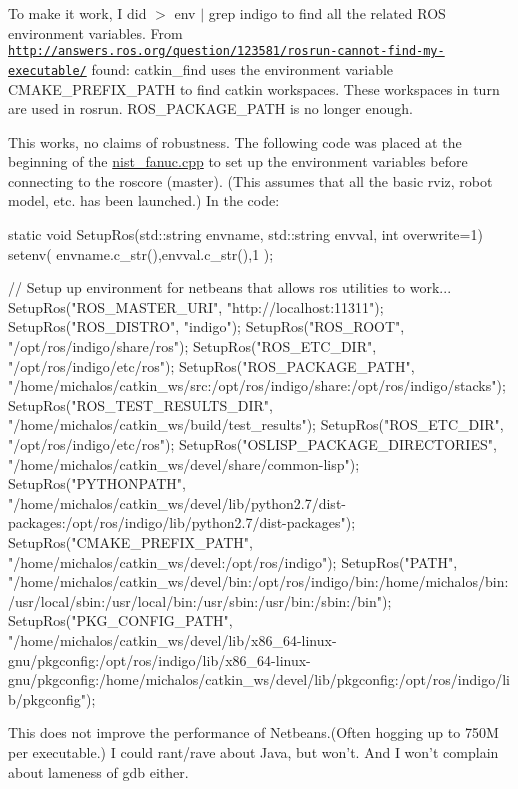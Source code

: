 To make it work, I did $>$ env $\vert$ grep indigo to find all the related R\-O\-S environment variables. From \href{http://answers.ros.org/question/123581/rosrun-cannot-find-my-executable/}{\tt http\-://answers.\-ros.\-org/question/123581/rosrun-\/cannot-\/find-\/my-\/executable/} found\-: catkin\-\_\-find uses the environment variable C\-M\-A\-K\-E\-\_\-\-P\-R\-E\-F\-I\-X\-\_\-\-P\-A\-T\-H to find catkin workspaces. These workspaces in turn are used in rosrun. R\-O\-S\-\_\-\-P\-A\-C\-K\-A\-G\-E\-\_\-\-P\-A\-T\-H is no longer enough.

This works, no claims of robustness. The following code was placed at the beginning of the \hyperlink{nist__fanuc_8cpp}{nist\-\_\-fanuc.\-cpp} to set up the environment variables before connecting to the roscore (master). (This assumes that all the basic rviz, robot model, etc. has been launched.) In the code\-: \begin{DoxyVerb}static void SetupRos(std::string  envname, std::string envval, int overwrite=1)
{
        setenv( envname.c_str(),envval.c_str(),1 );
}

       // Setup up environment for netbeans that allows ros utilities to work...
        SetupRos("ROS_MASTER_URI", "http://localhost:11311");
        SetupRos("ROS_DISTRO", "indigo");
        SetupRos("ROS_ROOT", "/opt/ros/indigo/share/ros");
        SetupRos("ROS_ETC_DIR", "/opt/ros/indigo/etc/ros");
        SetupRos("ROS_PACKAGE_PATH", "/home/michalos/catkin_ws/src:/opt/ros/indigo/share:/opt/ros/indigo/stacks");
        SetupRos("ROS_TEST_RESULTS_DIR", "/home/michalos/catkin_ws/build/test_results");
        SetupRos("ROS_ETC_DIR", "/opt/ros/indigo/etc/ros");
        SetupRos("OSLISP_PACKAGE_DIRECTORIES", "/home/michalos/catkin_ws/devel/share/common-lisp");
        SetupRos("PYTHONPATH", "/home/michalos/catkin_ws/devel/lib/python2.7/dist-packages:/opt/ros/indigo/lib/python2.7/dist-packages");
        SetupRos("CMAKE_PREFIX_PATH", "/home/michalos/catkin_ws/devel:/opt/ros/indigo");
        SetupRos("PATH", "/home/michalos/catkin_ws/devel/bin:/opt/ros/indigo/bin:/home/michalos/bin:/usr/local/sbin:/usr/local/bin:/usr/sbin:/usr/bin:/sbin:/bin");
        SetupRos("PKG_CONFIG_PATH", "/home/michalos/catkin_ws/devel/lib/x86_64-linux-gnu/pkgconfig:/opt/ros/indigo/lib/x86_64-linux-gnu/pkgconfig:/home/michalos/catkin_ws/devel/lib/pkgconfig:/opt/ros/indigo/lib/pkgconfig");
\end{DoxyVerb}


This does not improve the performance of Netbeans.(Often hogging up to 750\-M per executable.) I could rant/rave about Java, but won't. And I won't complain about lameness of gdb either.

